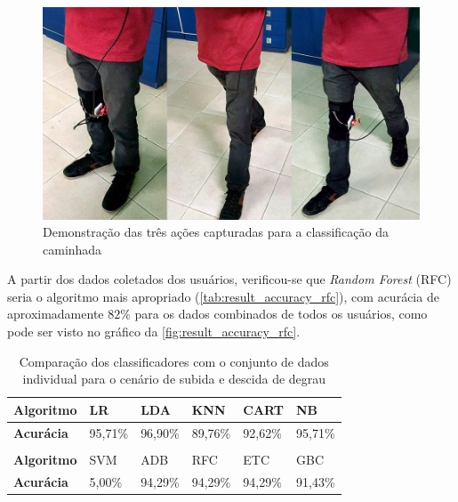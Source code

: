\begin{figure}[ht]
	\caption{\label{fig:result_estados}Demonstração das três ações capturadas para a classificação da caminhada}
	\begin{center}
	    \includegraphics[width=.8\textwidth]{resources/result_estados}
	\end{center}
\end{figure}

A partir dos dados coletados dos usuários, verificou-se que \textit{Random Forest} (RFC) seria o algoritmo mais apropriado (\autoref{tab:result_accuracy_rfc}), com acurácia de aproximadamente \(82\%\) para os dados combinados de todos os usuários, como pode ser visto no gráfico da \autoref{fig:result_accuracy_rfc}.

\begin{table}[ht]
\caption{Comparação dos classificadores com o conjunto de dados individual para o cenário de subida e descida de degrau}
\label{tab:result_accuracy_rfc}
\begin{tabularx}{\textwidth}{|X|X|X|X|X|X|}
\hline
\textbf{Algoritmo} & LR      & LDA     & KNN     & CART    & NB      \\ \hline
\textbf{Acurácia}  & 95,71\% & 96,90\% & 89,76\% & 92,62\% & 95,71\% \\ \hline
                   &         &         &         &         &         \\ \hline
\textbf{Algoritmo} & SVM     & ADB     & RFC     & ETC     & GBC     \\ \hline
\textbf{Acurácia}  & 5,00\%  & 94,29\% & 94,29\% & 94,29\% & 91,43\% \\ \hline
\end{tabularx}
\end{table}

